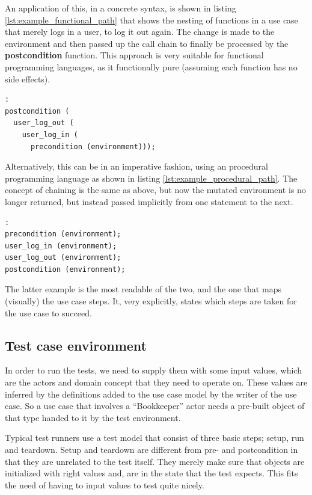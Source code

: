 \noindent An application of this, in a concrete syntax, is shown in listing \ref{lst:example_functional_path} that shows the nesting of functions in a use case that merely logs in a user, to log it out again. The change is made to the environment and then passed up the call chain to finally be processed by the \textbf{postcondition} function. This approach is very suitable for functional programming languages, as it functionally pure (assuming each function has no side effects).

\begin{lstlisting}[caption=example language for mapping concepts,label={lst:example_functional_path}]:
postcondition (
  user_log_out (
    user_log_in (
      precondition (environment)));
\end{lstlisting}

\noindent Alternatively, this can be in an imperative fashion, using an procedural programming language as shown in listing \ref{lst:example_procedural_path}. The concept of chaining is the same as above, but now the mutated environment is no longer returned, but instead passed implicitly from one statement to the next.

\begin{lstlisting}[caption=example language for mapping concepts,label={lst:example_procedural_path}]:
precondition (environment);
user_log_in (environment);
user_log_out (environment);
postcondition (environment);
\end{lstlisting}

\noindent The latter example is the most readable of the two, and the one that maps (visually) the use case steps. It, very explicitly, states which steps are taken for the use case to succeed.

\subsection{Test case environment}
\label{sec:test_case_state}
In order to run the tests, we need to supply them with some input values, which are the actors and domain concept that they need to operate on. These values are inferred by the definitions added to the use case model by the writer of the use case. So a use case that involves a ``Bookkeeper'' actor needs a pre-built object of that type handed to it by the test environment.\medskip

\noindent Typical test runners use a test model that consist of three basic steps; setup, run and teardown. Setup and teardown are different from pre- and postcondition in that they are unrelated to the test itself. They merely make sure that objects are initialized with right values and, are in the state that the test expects. This fits the need of having to input values to test quite nicely.\medskip

